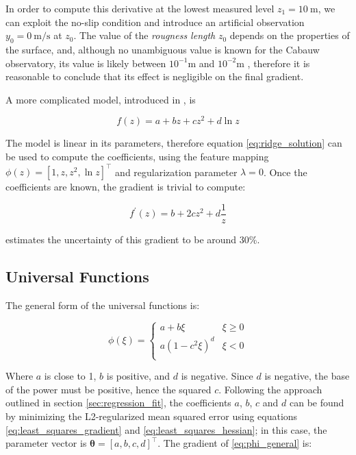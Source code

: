 \documentclass[12pt]{book}
\begin{document}
In order to compute this derivative at the lowest measured level $z_1=\SI{10}{\meter}$, we can exploit the no-slip condition and introduce an artificial observation $y_0=\SI{0}{\meter\per\second}$ at $z_0$. The value of the \emph{rougness length} $z_0$ depends on the properties of the surface, and, although no unambiguous value is known for the Cabauw observatory, its value is likely between $10^{-1}$m and $10^{-2}$m \cite{cabauw_z0, cabauw_night}, therefore it is reasonable to conclude that its effect is negligible on the final gradient.

A more complicated model, introduced in \cite{windlogprofile}, is

\begin{equation}
\label{eq:logmodel}
f(z)=a+bz+cz^2+d\ln z
\end{equation}

The model is linear in its parameters, therefore equation \ref{eq:ridge_solution} can be used to compute the coefficients, using the feature mapping $\phi(z)=\left[1,z,z^2,\ln z\right]^\intercal$ and regularization parameter $\lambda=0$. Once the coefficients are known, the gradient is trivial to compute:

\begin{equation}
f^\prime(z)=b+2cz^2+d\frac{1}{z}
\end{equation}

\cite{windlogprofile} estimates the uncertainty of this gradient to be around 30\%.

\subsection{Universal Functions}
The general form of the universal functions is:

\begin{equation}
\label{eq:phi_general}
\phi(\xi)=\begin{cases}
a+b\xi & \xi\geq 0 \\
a(1-c^2\xi)^d & \xi<0 \\
\end{cases}
\end{equation}

Where $a$ is close to 1, $b$ is positive, and $d$ is negative. Since $d$ is negative, the base of the power must be positive, hence the squared $c$. Following the approach outlined in section \ref{sec:regression_fit}, the coefficients $a$, $b$, $c$ and $d$ can be found by minimizing the L2-regularized mean squared error using equations \ref{eq:least_squares_gradient} and \ref{eq:least_squares_hessian}; in this case, the parameter vector is $\bm\theta=\left[a,b,c,d\right]^\intercal$. The gradient of \ref{eq:phi_general} is:
\end{document}

